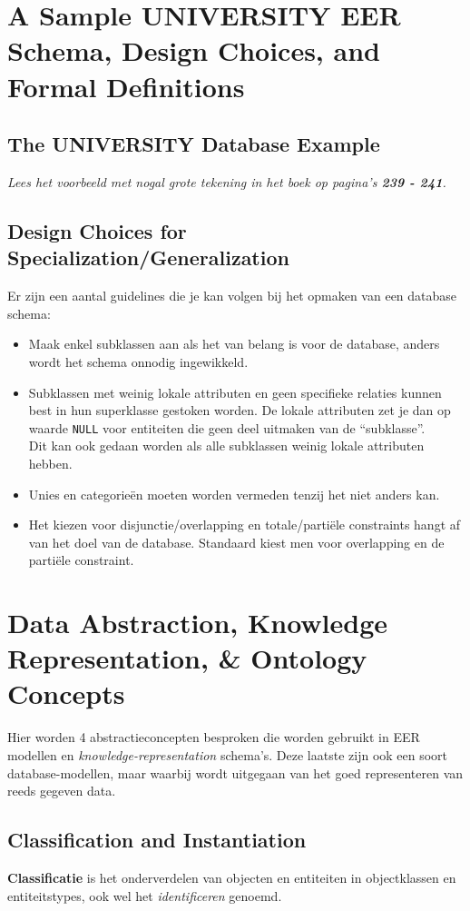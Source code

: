 \section{A Sample UNIVERSITY EER Schema, Design Choices, and Formal Definitions}
\subsection{The UNIVERSITY Database Example}
\textit{Lees het voorbeeld met nogal grote tekening in het boek op pagina's \textbf{239 - 241}.}

\subsection{Design Choices for Specialization/Generalization}
Er zijn een aantal guidelines die je kan volgen bij het opmaken van een database schema:
\begin{itemize}
\item Maak enkel subklassen aan als het van belang is voor de database, anders wordt het schema onnodig ingewikkeld.
\item Subklassen met weinig lokale attributen en geen specifieke relaties kunnen best in hun superklasse gestoken worden. De lokale attributen zet je dan op waarde \texttt{NULL} voor entiteiten die geen deel uitmaken van de ``subklasse''.\\
Dit kan ook gedaan worden als alle subklassen weinig lokale attributen hebben.
\item Unies en categorie\"en moeten worden vermeden tenzij het niet anders kan.
\item Het kiezen voor disjunctie/overlapping en totale/parti\"ele constraints hangt af van het doel van de database. Standaard kiest men voor overlapping en de parti\"ele constraint.
\end{itemize}


\newpage
\section{Data Abstraction, Knowledge Representation, \& Ontology Concepts}
Hier worden 4 abstractieconcepten besproken die worden gebruikt in EER modellen en \textit{knowledge-representation} schema's. Deze laatste zijn ook een soort database-modellen, maar waarbij wordt uitgegaan van het goed representeren van reeds gegeven data.

\subsection{Classification and Instantiation}
\textbf{Classificatie} is het onderverdelen van objecten en entiteiten in objectklassen en entiteitstypes, ook wel het \textit{identificeren} genoemd. 


